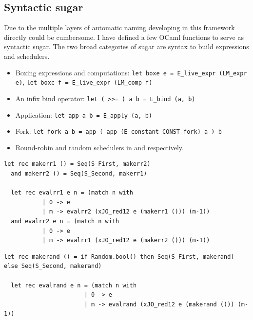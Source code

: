 \documentclass[12pt,twoside,notitlepage]{report}
\begin{document}
\subsection{Syntactic sugar}
Due to the multiple layers of automatic naming developing in this framework directly could be cumbersome. I have defined a few OCaml functions to serve as syntactic sugar. The two broad categories of sugar are syntax to build expressions and schedulers. 
\begin{itemize}
\item{Boxing expressions and computations: \lstinline|let boxe e = E_live_expr (LM_expr e)|, \lstinline|let boxc f = E_live_expr (LM_comp f)|}
\item{An infix bind operator: \lstinline|let ( >>= ) a b = E_bind (a, b)|}
\item{Application: \lstinline|let app a b = E_apply (a, b)|}
\item{Fork: \lstinline|let fork a b = app ( app (E_constant CONST_fork) a ) b|}
\item{Round-robin and random schedulers in  and  respectively.}
\end{itemize}
\begin{minipage}{\linewidth}

\begin{lstlisting}[caption={OCaml round-robin scheduler}, label={lst:ocamlrrsched}]
  let rec makerr1 () = Seq(S_First, makerr2) 
  and makerr2 () = Seq(S_Second, makerr1) 
  
  let rec evalrr1 e n = (match n with 
           | 0 -> e
           | m -> evalrr2 (xJO_red12 e (makerr1 ())) (m-1))
  and evalrr2 e n = (match n with 
           | 0 -> e
           | m -> evalrr1 (xJO_red12 e (makerr2 ())) (m-1))
\end{lstlisting}

\end{minipage}
\begin{minipage}{\linewidth}

\begin{lstlisting}[caption={OCaml random scheduler}, label={lst:ocamlrandsched}]
  let rec makerand () = if Random.bool() then Seq(S_First, makerand) else Seq(S_Second, makerand)
  
  let rec evalrand e n = (match n with 
                       | 0 -> e
                       | m -> evalrand (xJO_red12 e (makerand ())) (m-1))
\end{lstlisting}

\end{minipage}
\end{document}
